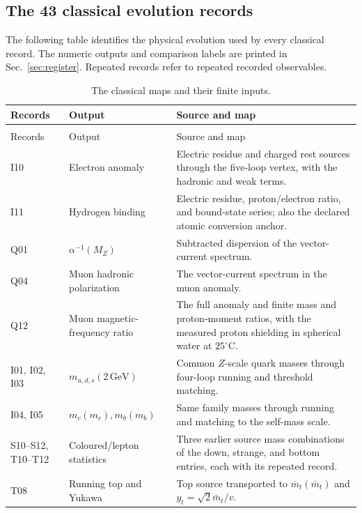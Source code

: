 \documentclass[aps,prx,onecolumn,10pt,notitlepage,nofootinbib,longbibliography]{revtex4-2}
\numberwithin{equation}{section}
\numberwithin{table}{section}
\newcommand{\GeV}{\,\mathrm{GeV}}
\begin{document}
\subsection{The 43 classical evolution records}
The following table identifies the physical evolution used by every classical record. The numeric outputs and comparison labels are printed in Sec.~\ref{sec:register}. Repeated records refer to repeated recorded observables.
\begingroup
\small
\setlength{\tabcolsep}{4pt}
\begin{longtable}{@{}>{\raggedright\arraybackslash}p{}>{\raggedright\arraybackslash}p{}>{\raggedright\arraybackslash}p{}@{}}
\caption{The classical maps and their finite inputs.}\label{tab:classicalmaps}\\
\toprule
Records&Output&Source and map\\\midrule
\endfirsthead
\multicolumn{3}{l}{\textit{Transport table, continued}}\\
\toprule Records&Output&Source and map\\\midrule
\endhead
\bottomrule\endfoot
I10&Electron anomaly&Electric residue and charged rest sources through the five-loop vertex, with the hadronic and weak terms.\\[3pt]
I11&Hydrogen binding&Electric residue, proton/electron ratio, and bound-state series; also the declared atomic conversion anchor.\\[3pt]
Q01&$\alpha^{-1}(M_Z)$&Subtracted dispersion of the vector-current spectrum.\\[3pt]
Q04&Muon hadronic polarization&The vector-current spectrum in the muon anomaly.\\[3pt]
Q12&Muon magnetic-frequency ratio&The full anomaly and finite mass and proton-moment ratios, with the measured proton shielding in spherical water at $25^\circ\mathrm C$.\\[3pt]
I01, I02, I03&$m_{u,d,s}(2\GeV)$&Common $Z$-scale quark masses through four-loop running and threshold matching.\\[3pt]
I04, I05&$m_c(m_c),m_b(m_b)$&Same family masses through running and matching to the self-mass scale.\\[3pt]
S10--S12, T10--T12&Coloured/lepton statistics&Three earlier source mass combinations of the down, strange, and bottom entries, each with its repeated record.\\[3pt]
T08&Running top and Yukawa&Top source transported to $\bar m_t(\bar m_t)$ and $y_t=\sqrt2\bar m_t/v$.\\[3pt]

\end{longtable}
\end{document}
